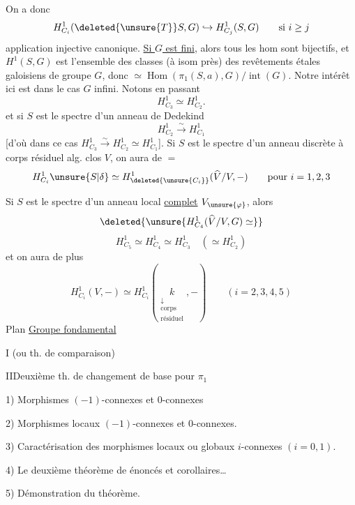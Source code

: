 
On a donc
\[
H^1_{C_i}(\deleted{\unsure{T}}S,G)\hookrightarrow H^1_{C_j}(S,G)\qquad\text{si }i\geq j
\]
application injective canonique. \uline{Si $G$ est fini}, alors tous les hom sont bijectifs, et $H^1(S,G)$ est l'ensemble des classes (à isom près) des revêtements étales galoisiens de groupe $G$, donc $\simeq\operatorname{Hom}(\pi_1(S,a),G)/\operatorname{int}(G)$. Notre intérêt ici est dans le cas $G$ infini. Notons en passant
\[
H^1_{C_3}\simeq H^1_{C_2}.
\]
et si $S$ est le spectre d'un anneau de Dedekind
\[
H^1_{C_2}\xrightarrow{\sim}H^1_{C_1}
\]
[d'où dans ce cas $H^1_{C_3}\xrightarrow{\sim}H^1_{C_2}\simeq H^1_{C_1}$].
Si $S$ est le spectre d'un anneau   discrète à corps résiduel alg. clos $V$, on aura de $=$
\[
H^1_{C_i}\unsure{S|\delta}\simeq H^1_{\deleted{\unsure{C_i}}}(\widehat V/V,-)
\qquad\text{pour }i=1,2,3
\]

Si $S$ est le spectre d'un anneau local \uline{complet} $V_{\unsure{\varphi}}$, alors
\[
\deleted{\unsure{H^1_{C_4}(\widehat V/V,G)\simeq}}
\]
\[
H^1_{C_5}\simeq H^1_{C_4}\simeq H^1_{C_3}\quad(\simeq H^1_{C_2})
\]
et on aura de plus
\[
H^1_{C_i}(V,-)\simeq H^1_{C_i}
(\underset{\substack{\downarrow\\\text{corps}\\\text{résiduel}}}{k},-)
\qquad(i=2,3,4,5)
\]
Plan
\uline{Groupe fondamental}

I\quad {}
(ou th. de comparaison)

II\quad Deuxième th. de changement de base pour $\pi_1$

1) Morphismes $(-1)$-connexes et $0$-connexes

2) Morphismes locaux $(-1)$-connexes et $0$-connexes.

3)  Caractérisation des morphismes locaux ou globaux $i$-connexes $(i=0,1)$.

4) Le deuxième théorème de   énoncés et corollaires\ldots

5)  Démonstration du théorème.

